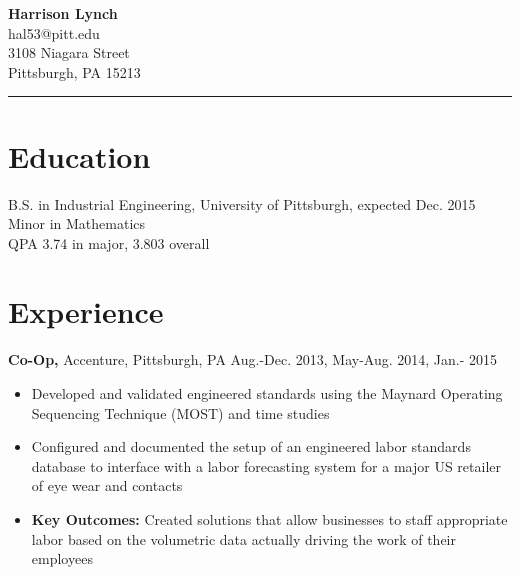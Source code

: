 \documentclass[margin]{res}
\begin{document}
 
 
\begin{flushleft}

\textbf{\LARGE{Harrison Lynch}} \\
\small{hal53@pitt.edu \vspace{2.5mm} \\
3108 Niagara Street \\
Pittsburgh, PA 15213}
\rule{132mm}{0.2}
\vspace{-16mm}


\end{flushleft}

\begin{resume} 
 

\section{Education} 
B.S. in Industrial Engineering, University of Pittsburgh, expected Dec. 2015 \\
Minor in Mathematics \\
QPA 3.74 in major, 3.803 overall

 
\section{Experience}
 {\bf Co-Op,} Accenture, Pittsburgh, PA \hfill Aug.-Dec. 2013, May-Aug. 2014, Jan.- 2015
 \begin{itemize} \itemsep -2pt  %
 \item Developed and validated engineered standards using the Maynard Operating Sequencing Technique (MOST) and time studies
 \item Configured and documented the setup of an engineered labor standards database to interface with a labor forecasting system for a major US retailer of eye wear and contacts
 \item \textbf{Key Outcomes:} Created solutions that allow businesses to staff appropriate labor based on the volumetric data actually driving the work of their employees
 \end{itemize}




\end{resume}
\end{document}
